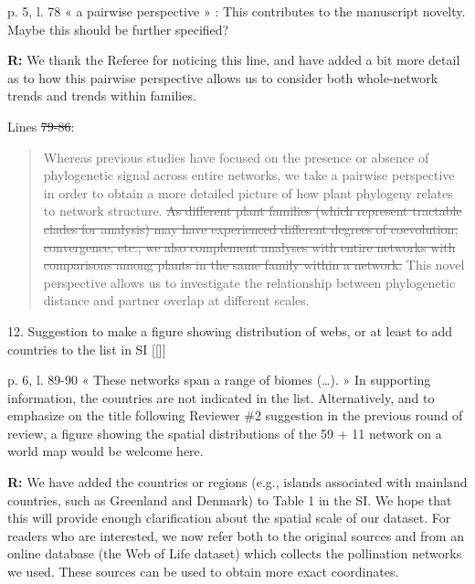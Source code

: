 \documentclass[12pt]{letter}
\newenvironment{refquote}{\bigskip \begin{it}}{\end{it}\smallskip}
\providecommand{\DIFadd}[1]{{\protect\color{blue}\uwave{#1}}} %
\providecommand{\DIFdel}[1]{{\protect\color{red}\sout{#1}}}                      %
\providecommand{\DIFaddbegin}{} %
\providecommand{\DIFaddend}{} %
\providecommand{\DIFdelbegin}{} %
\providecommand{\DIFdelend}{} %
\newcommand{\DIFscaledelfig}{0.5}
\newlength{\DIFdelgraphicswidth} %
\newlength{\DIFdelgraphicsheight} %
\newcommand{\DIFaddincludegraphics}[2][]{{\color{blue}\fbox{\DIFOincludegraphics[#1]{#2}}}} %
\newcommand{\DIFdelincludegraphics}[2][]{%
\sbox{\DIFdelgraphicsbox}{\DIFOincludegraphics[#1]{#2}}%
\settoboxwidth{\DIFdelgraphicswidth}{\DIFdelgraphicsbox} %
\settoboxtotalheight{\DIFdelgraphicsheight}{\DIFdelgraphicsbox} %
\scalebox{\DIFscaledelfig}{%
\parbox[b]{\DIFdelgraphicswidth}{\usebox{\DIFdelgraphicsbox}\\[-\baselineskip] \rule{\DIFdelgraphicswidth}{0em}}\llap{\resizebox{\DIFdelgraphicswidth}{\DIFdelgraphicsheight}{%
\setlength{\unitlength}{\DIFdelgraphicswidth}%
\begin{picture}(1,1)%
\thicklines\linethickness{2pt} %
{\color[rgb]{1,0,0}\put(0,0){\framebox(1,1){}}}%
{\color[rgb]{1,0,0}\put(0,0){\line( 1,1){1}}}%
{\color[rgb]{1,0,0}\put(0,1){\line(1,-1){1}}}%
\end{picture}%
}\hspace*{3pt}}} %
} %
\DeclareRobustCommand{\DIFaddbegin}{\DIFOaddbegin \let\includegraphics\DIFaddincludegraphics} %
\DeclareRobustCommand{\DIFaddend}{\DIFOaddend \let\includegraphics\DIFOincludegraphics} %
\DeclareRobustCommand{\DIFdelbegin}{\DIFOdelbegin \let\includegraphics\DIFdelincludegraphics} %
\DeclareRobustCommand{\DIFdelend}{\DIFOaddend \let\includegraphics\DIFOincludegraphics} %
\begin{document}
	\begin{refquote}
		p. 5, l. 78 « a pairwise perspective » : This contributes to the manuscript novelty. Maybe this should be further specified?
	\end{refquote}

	\textbf{R:} We thank the Referee for noticing this line, and have added a bit more detail as to how this pairwise perspective allows us to consider both whole-network trends and trends within families.


	Lines \DIFdelbegin \DIFdel{79-86}\DIFdelend \DIFaddbegin \DIFadd{XX-XX}\DIFaddend :

	\begin{quotation}

		Whereas previous 
	  studies have focused on the presence or absence of phylogenetic
	  signal across entire networks, we take a pairwise perspective in
	  order to obtain a more detailed picture of how plant phylogeny
	  relates to network structure. \DIFdelbegin \DIFdel{As different plant families (which represent tractable clades for analysis) may have experienced different degrees of coevolution, convergence, etc., we also complement analyses with entire networks with comparisons among plants in the same family within a network. 
			}\DIFdelend This novel perspective allows us to investigate the relationship between phylogenetic distance and partner overlap at different scales. 

	\end{quotation}


12. Suggestion to make a figure showing distribution of webs, or at least to add countries to the list in SI \DIFaddbegin [[\DIFadd{done}]]
\DIFaddend 

	\begin{refquote}
		p. 6, l. 89-90 « These networks span a range of biomes (…). » In supporting information, the countries are not indicated in the list. Alternatively, and to emphasize on the title following Reviewer \#2 suggestion in the previous round of review, a figure showing the spatial distributions of the 59 + 11 network on a world map would be welcome here.
	\end{refquote}


	\textbf{R:} We have added the countries or regions (e.g., islands associated with mainland countries, such as Greenland and Denmark) to Table 1 in the SI. We hope that this will provide enough clarification about the spatial scale of our dataset. For readers who are interested, we now refer both to the original sources and from an online database (the Web of Life dataset) which collects the pollination networks we used. These sources can be used to obtain more exact coordinates. 
\end{document}
